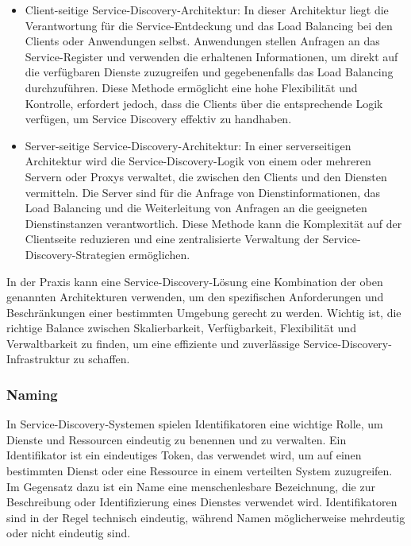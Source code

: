 \documentclass[../vs-script-first-v01.tex]{subfiles}
\begin{document}
\begin{itemize}
\item Client-seitige Service-Discovery-Architektur: In dieser Architektur liegt die Verantwortung für die Service-Entdeckung und das Load Balancing bei den Clients oder Anwendungen selbst. Anwendungen stellen Anfragen an das Service-Register und verwenden die erhaltenen Informationen, um direkt auf die verfügbaren Dienste zuzugreifen und gegebenenfalls das Load Balancing durchzuführen. Diese Methode ermöglicht eine hohe Flexibilität und Kontrolle, erfordert jedoch, dass die Clients über die entsprechende Logik verfügen, um Service Discovery effektiv zu handhaben.

\item Server-seitige Service-Discovery-Architektur: In einer serverseitigen Architektur wird die Service-Discovery-Logik von einem oder mehreren Servern oder Proxys verwaltet, die zwischen den Clients und den Diensten vermitteln. Die Server sind für die Anfrage von Dienstinformationen, das Load Balancing und die Weiterleitung von Anfragen an die geeigneten Dienstinstanzen verantwortlich. Diese Methode kann die Komplexität auf der Clientseite reduzieren und eine zentralisierte Verwaltung der Service-Discovery-Strategien ermöglichen.
\end{itemize}

In der Praxis kann eine Service-Discovery-Lösung eine Kombination der oben genannten Architekturen verwenden, um den spezifischen Anforderungen und Beschränkungen einer bestimmten Umgebung gerecht zu werden. Wichtig ist, die richtige Balance zwischen Skalierbarkeit, Verfügbarkeit, Flexibilität und Verwaltbarkeit zu finden, um eine effiziente und zuverlässige Service-Discovery-Infrastruktur zu schaffen.

\subsubsection{Naming}

In Service-Discovery-Systemen spielen Identifikatoren eine wichtige Rolle, um Dienste und Ressourcen eindeutig zu benennen und zu verwalten. Ein Identifikator ist ein eindeutiges Token, das verwendet wird, um auf einen bestimmten Dienst oder eine Ressource in einem verteilten System zuzugreifen. Im Gegensatz dazu ist ein Name eine menschenlesbare Bezeichnung, die zur Beschreibung oder Identifizierung eines Dienstes verwendet wird. Identifikatoren sind in der Regel technisch eindeutig, während Namen möglicherweise mehrdeutig oder nicht eindeutig sind.
\end{document}
